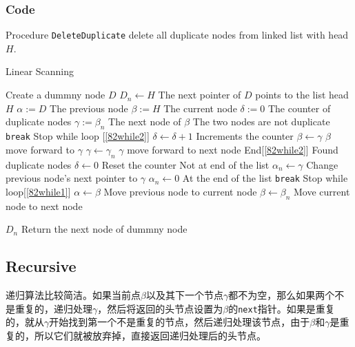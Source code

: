 \subsubsection{Code}
Procedure \texttt{DeleteDuplicate} delete all duplicate nodes from linked list with head $H$.
\setcounter{algorithm}{0}
\begin{algorithm}[H]
\caption{Linear Scanning}
\begin{algorithmic}[1]
\State Create a dummny node $D$
\State $D_n\gets H$ \Comment The next pointer of $D$ points to the list head $H$
\State $\alpha:=D$ \Comment The previous node
\State $\beta:=H$ \Comment The current node
 \label{82while1}
\State $\delta:=0$ \Comment The counter of duplicate nodes
\State $\gamma:=\beta_n$ \Comment The next node of $\beta$
 \label{82while2}
 \Comment The two nodes are not duplicate
\State \texttt{break} \Comment Stop while loop [\ref{82while2}]
\EndIf
\State $\delta\gets \delta+1$ \Comment Increments the counter
\State $\beta \gets \gamma$ \Comment $\beta$ move forward to $\gamma$
\State $\gamma \gets \gamma_n$ \Comment $\gamma$ move forward to next node
\EndWhile \Comment End[\ref{82while2}]
 \Comment Found duplicate nodes
\State $\delta\gets 0$ \Comment Reset the counter
 \Comment Not at end of the list
\State $\alpha_n\gets \gamma$ \Comment Change previous node's next pointer to $\gamma$
\Else
\State $\alpha_n\gets 0$ \Comment At the end of the list
\State \texttt{break} \Comment Stop while loop[\ref{82while1}]
\EndIf
\Else
\State $\alpha \gets \beta$ \Comment Move previous node to current node
\EndIf
\State $\beta\gets \beta_n$ \Comment Move current node to next node
\EndWhile
{}
\end{algorithmic}
\end{algorithm}
\begin{algorithm}[H]
\begin{algorithmic}[1]
\State \Return $D_n$ \Comment Return the next node of dummny node
\EndProcedure
\end{algorithmic}
\end{algorithm}
\subsection{Recursive}
\begin{CJK*}{UTF8}{gbsn}
递归算法比较简洁。如果当前点$\beta$以及其下一个节点$\gamma$都不为空，那么如果两个不是重复的，递归处理$\gamma$，然后将返回的头节点设置为$\beta$的\texttt{next}指针。如果是重复的，就从$\gamma$开始找到第一个不是重复的节点，然后递归处理该节点，由于$\beta$和$\gamma$是重复的，所以它们就被放弃掉，直接返回递归处理后的头节点。
\end{CJK*}
